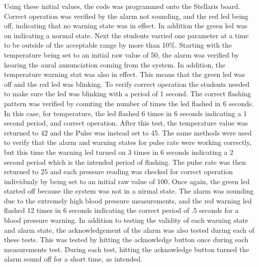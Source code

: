 \documentclass[12pt]{article} %
\begin{document}
Using these initial values, the code was programmed onto the Stellaris board.
Correct operation was verified by the alarm not sounding, and the red led being
off, indicating that no warning state was in effect. In addition the green led
was on indicating a normal state. Next the students varried one parameter at a
time to be outside of the acceptable range by more than 10\%. Starting with the
temperature being set to an initial raw value of 50, the alarm was verified by
hearing the aural annunciation coming from the system. In addition, the
temperature warning stat was also in effect. This means that the green led was
off and the red led was blinking. To verify correct operation the students
needed to make sure the led was blinking with a period of 1 second. The correct
flashing pattern was verified by counting the number of times the led flashed
in 6 seconds. In this case, for temperature, the led flashed 6 times in 6
seconds indicating a 1 second period, and correct operation. After this test,
the temperature value was returned to 42 and the Pulse was instead set to 45.
The same methods were used to verify that the alarm and warning states for
pulse rate were working correctly, but this time the warning led turned on 3
times in 6 seconds indicating a 2 second period which is the intended period of
flashing. The pulse rate was then returned to 25 and each pressure reading was
checked for correct operation individualy by being set to an initial raw value
of 100. Once again, the green led started off because the system was not in a
nirmal state. The alarm was sounding due to the extremely high blood pressure
measurements, and the red warning led flashed 12 times in 6 seconds indicating
the correct period of .5 seconds for a blood pressure warning. In addition to
testing the validity of each warning state and alarm state, the acknowledgement
of the alarm was also tested during each of these tests. This was tested by
hitting the acknowledge button once during each measurements test. During each
test, hitting the acknowledge button turned the alarm sound off for a short
time, as intended. 
\end{document}
